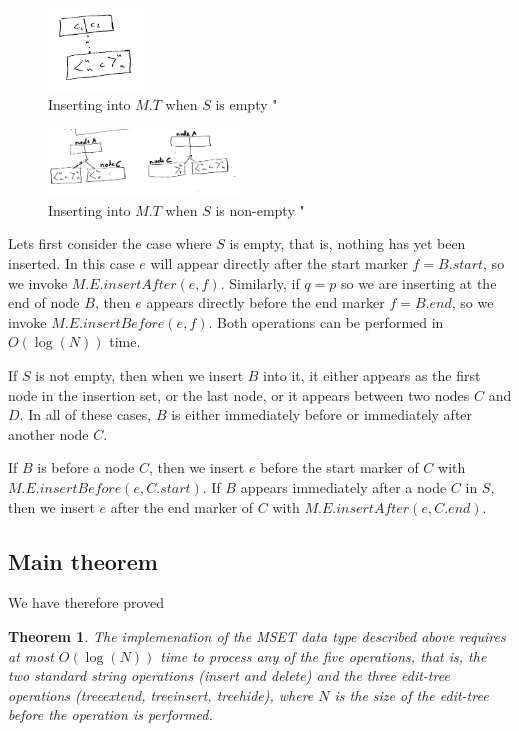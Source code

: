\documentclass{amsart}
\newtheorem{theorem}{Theorem}[section]
\begin{document}
\begin{figure}[h]
\centering
\includegraphics[width=1.0in]{insertTree001.jpg}
\caption{Inserting into $M.T$ when $S$ is empty \label{fig:emptyS}"}
\end{figure}

\begin{figure}[h]
\centering
\includegraphics[width=2.0in]{insertTree002.jpg}
\caption{Inserting into $M.T$ when $S$ is non-empty \label{fig:nonemptyS}"}
\end{figure}

Lets first consider the case where $S$ is empty, that is, nothing has yet been inserted. In this case $e$ will appear directly after the start marker $f = B.start$,
so we invoke $M.E.insertAfter(e,f)$.  Similarly, if $q=p$ so we are inserting at the end of node $B$, then $e$ appears directly before the end marker $f=B.end$,
so we invoke $M.E.insertBefore(e,f)$. Both operations can be performed in $O(\log(N))$ time.

If $S$ is not empty, then when we insert $B$ into it, it either appears as the first node in the insertion set, or the last node, or it appears between two nodes $C$ and $D$. In all of these cases, $B$ is either immediately before or immediately after another node $C$.

If $B$ is before a node $C$, then we insert $e$ before the start marker of $C$ with
$M.E.insertBefore(e,C.start)$. If $B$ appears immediately after a node $C$ in $S$,
then we insert $e$ after the end marker of $C$ with
$M.E.insertAfter(e,C.end)$.


\subsection{Main theorem}
We have therefore proved 

\begin{theorem}
The implemenation of the MSET data type described above requires at most
$O(\log(N))$ time to process any of the five operations, that is,
the two standard string operations (insert and delete) and
the three edit-tree operations (treeextend, treeinsert, treehide), where $N$ is the size of the edit-tree before the operation is performed.
\end{theorem}
\end{document}
